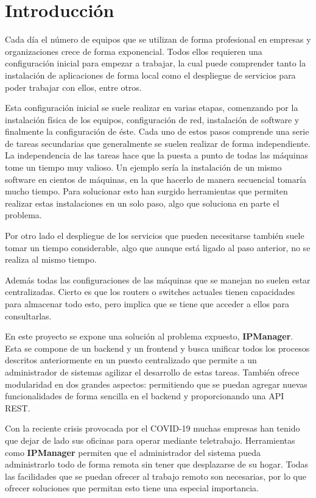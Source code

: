 \chapter{Introducción}


Cada día el número de equipos que se utilizan de forma profesional en empresas y organizaciones crece de forma exponencial. Todos ellos requieren una configuración inicial para empezar a trabajar, la cual puede comprender tanto la instalación de aplicaciones de forma local como el despliegue de servicios para poder trabajar con ellos, entre otros.

Esta configuración inicial se suele realizar en varias etapas, comenzando por la instalación física de los equipos, configuración de red, instalación de software y finalmente la configuración de éste. Cada uno de estos pasos comprende una serie de tareas secundarias que generalmente se suelen realizar de forma independiente. La independencia de las tareas hace que la puesta a punto de todas las máquinas tome un tiempo muy valioso. Un ejemplo sería la instalación de un mismo software en cientos de máquinas, en la que hacerlo de manera secuencial tomaría mucho tiempo. Para solucionar esto han surgido herramientas que permiten realizar estas instalaciones en un solo paso, algo que soluciona en parte el problema.

Por otro lado el despliegue de los servicios que pueden necesitarse también suele tomar un tiempo considerable, algo que aunque está ligado al paso anterior, no se realiza al mismo tiempo.

Además todas las configuraciones de las máquinas que se manejan no suelen estar centralizadas. Cierto es que los routers o switches actuales tienen capacidades para almacenar todo esto, pero implica que se tiene que acceder a ellos para consultarlas.

En este proyecto se expone una solución al problema expuesto, \textbf{IPManager}. Esta se compone de un backend y un frontend y busca unificar todos los procesos descritos anteriormente en un puesto centralizado que permite a un administrador de sistemas agilizar el desarrollo de estas tareas. También ofrece modularidad en dos grandes aspectos: permitiendo que se puedan agregar nuevas funcionalidades de forma sencilla en el backend y proporcionando una API REST.

Con la reciente crisis provocada por el COVID-19 muchas empresas han tenido que dejar de lado sus oficinas para operar mediante teletrabajo. Herramientas como \textbf{IPManager} permiten que el administrador del sistema pueda administrarlo todo de forma remota sin tener que desplazarse de su hogar. Todas las facilidades que se puedan ofrecer al trabajo remoto son necesarias, por lo que ofrecer soluciones que permitan esto tiene una especial importancia.

